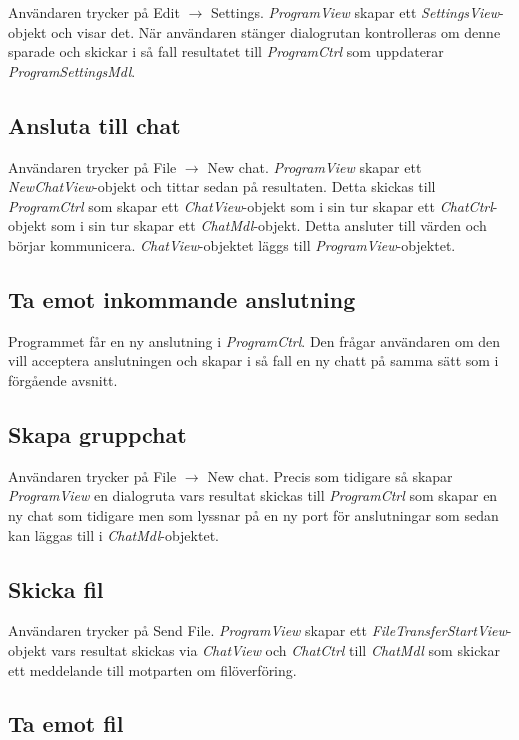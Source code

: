 \documentclass{article}
\begin{document}
Användaren trycker på Edit $\rightarrow$ Settings. \emph{ProgramView} skapar ett \emph{SettingsView}-objekt och visar det. När användaren stänger dialogrutan kontrolleras om denne sparade och skickar i så fall resultatet till \emph{ProgramCtrl} som uppdaterar \emph{ProgramSettingsMdl}.

\subsection{Ansluta till chat}

Användaren trycker på File $\rightarrow$ New chat. \emph{ProgramView} skapar ett \emph{NewChatView}-objekt och tittar sedan på resultaten. Detta skickas till \emph{ProgramCtrl} som skapar ett \emph{ChatView}-objekt som i sin tur skapar ett \emph{ChatCtrl}-objekt som i sin tur skapar ett \emph{ChatMdl}-objekt. Detta ansluter till värden och börjar kommunicera. \emph{ChatView}-objektet läggs till \emph{ProgramView}-objektet.

\subsection{Ta emot inkommande anslutning}

Programmet får en ny anslutning i \emph{ProgramCtrl}. Den frågar användaren om den vill acceptera anslutningen och skapar i så fall en ny chatt på samma sätt som i förgående avsnitt.

\subsection{Skapa gruppchat}

Användaren trycker på File $\rightarrow$ New chat. Precis som tidigare så skapar \emph{ProgramView} en dialogruta vars resultat skickas till \emph{ProgramCtrl} som skapar en ny chat som tidigare men som lyssnar på en ny port för anslutningar som sedan kan läggas till i \emph{ChatMdl}-objektet.

\subsection{Skicka fil}

Användaren trycker på Send File. \emph{ProgramView} skapar ett \emph{FileTransferStartView}-objekt vars resultat skickas via \emph{ChatView} och \emph{ChatCtrl} till \emph{ChatMdl} som skickar ett meddelande till motparten om filöverföring.

\subsection{Ta emot fil}
\end{document}
